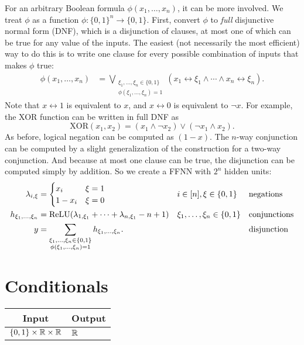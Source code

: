     For an arbitrary Boolean formula $\phi(x_1, \ldots, x_n)$, it can be more involved.
    We treat $\phi$ as a function $\phi \colon \{0,1\}^n \to \{0,1\}$.
    First, convert $\phi$ to \emph{full} disjunctive normal form (DNF), which is a disjunction of clauses, at most one of which can be true for any value of the inputs. The easiest (not necessarily the most efficient) way to do this is to write one clause for every possible combination of inputs that makes $\phi$ true:
    \begin{align}
      \phi(x_1, \ldots, x_n) &= \bigvee_{\substack{\xi_1, \ldots, \xi_n \in \{0, 1\} \\ \phi(\xi_1, \ldots, \xi_n) = 1}} ( x_1 \leftrightarrow \xi_1 \land \cdots \land x_n \leftrightarrow \xi_n ).
    \end{align}
    Note that $x \leftrightarrow 1$ is equivalent to $x$, and $x \leftrightarrow 0$ is equivalent to $\lnot x$.
    For example, the XOR function can be written in full DNF as \[ \text{XOR}(x_1, x_2) = (x_1 \land \neg x_2) \lor (\neg x_1 \land x_2).\]
    As before, logical negation can be computed as $(1-x)$. The $n$-way conjunction can be computed by a slight generalization of the construction for a two-way conjunction. And because at most one clause can be true, the disjunction can be computed simply by addition. So we create a FFNN with $2^n$ hidden units:
    \begin{align}
      \lambda_{i,\xi} &= \begin{cases}
        x_i & \xi = 1 \\
        1-x_i & \xi = 0 
      \end{cases} && i \in [n], \xi \in \{0,1\} && \text{negations} \\
      h_{\xi_1, \ldots, \xi_n} &= \text{ReLU}(\lambda_{1,\xi_1} + \cdots + \lambda_{n,\xi_1} - n + 1) && \xi_1, \ldots, \xi_n \in \{0, 1\} && \text{conjunctions} \\
      y &= \sum_{\substack{\xi_1, \ldots, \xi_n \in \{0,1\} \\ \phi(\xi_1, \ldots, \xi_n) = 1}} h_{\xi_1, \ldots, \xi_n}. && && \text{disjunction}
    \end{align}
    
\section{Conditionals}\label{sec:ffnn_conditional}

    \begin{tabular}{|c|p{1.5cm}|}
        \hline
        \rowcolor{orange!20} %
        \textbf{Input} & \textbf{Output} \\
        \hline
        $\{0,1\}\times \mathbb{R} \times \mathbb{R}$ & $\mathbb{R}$ \\
        \hline
    \end{tabular}

